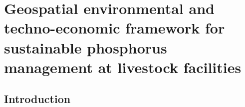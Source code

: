 \chapter{Geospatial environmental and techno-economic framework for	sustainable phosphorus management at livestock facilities}\label{ch:Tool}
\section{Introduction}
